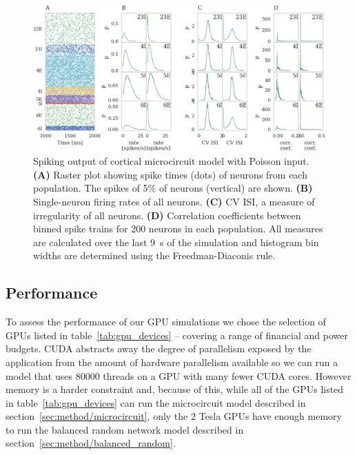 \documentclass[utf8]{frontiersSCNS} %
\begin{document}
\begin{figure}[h!]
    \begin{center}
        \includegraphics[width=180mm]{figures/microcircuit_accuracy}
    \end{center}
    \caption{Spiking output of cortical microcircuit model with Poisson input.  
    \textbf{(A)} Raster plot showing spike times (dots) of neurons from each population. 
    The spikes of 5\% of neurons (vertical) are shown.
    \textbf{(B)} Single-neuron firing rates of all neurons.
    \textbf{(C)} CV ISI, a measure of irregularity of all neurons.
    \textbf{(D)} Correlation coefficients between binned spike trains for \num{200} neurons in each population.
    All measures are calculated over the last \SI{9}{\second} of the simulation and histogram bin widths are determined using the Freedman-Diaconis rule.}
    \label{fig:microcircuit_accuracy}
\end{figure}

\subsection{Performance}
\label{sec:results/performance}
To assess the performance of our GPU simulations we chose the selection of GPUs listed in table~\ref{tab:gpu_devices} -- covering a range of financial and power budgets.
CUDA abstracts away the degree of parallelism exposed by the application from the amount of hardware parallelism available so we can run a model that uses \num{80000} threads on a GPU with many fewer CUDA cores.
However memory is a harder constraint and, because of this, while all of the GPUs listed in table~\ref{tab:gpu_devices} can run the microcircuit model described in section~\ref{sec:method/microcircuit}, only the 2 Tesla GPUs have enough memory to run the balanced random network model described in section~\ref{sec:method/balanced_random}.
\end{document}
